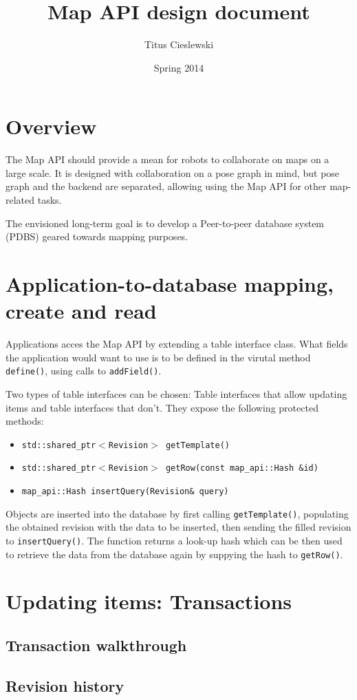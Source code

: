 \documentclass{article}
\title{Map API design document}
\author{Titus Cieslewski}
\date{Spring 2014}
\begin{document}
\maketitle

\section{Overview}

The Map API should provide a mean for robots to collaborate on maps on a large
scale. It is designed with collaboration on a pose graph in mind, but pose
graph and the backend are separated, allowing using the Map API for other
map-related tasks.

The envisioned long-term goal is to develop a Peer-to-peer database system
(PDBS) geared towards mapping purposes.

\section{Application-to-database mapping, create and read}

Applications acces the Map API by extending a table interface class. What
fields the application would want to use is to be defined in the virutal
method {\tt define()}, using calls to {\tt addField()}.

Two types of table interfaces can be chosen: Table interfaces that allow
updating items and table interfaces that don't. They expose the following
protected methods:

\begin{itemize} \itemsep0em
  \item {\tt std::shared\_ptr$<$Revision$>$ getTemplate()}
  \item {\tt std::shared\_ptr$<$Revision$>$ getRow(const map\_api::Hash \&id)}
  \item {\tt map\_api::Hash insertQuery(Revision\& query)}
\end{itemize}

Objects are inserted into the database by first calling {\tt getTemplate()},
populating the obtained revision with the data to be inserted, then sending
the filled revision to {\tt insertQuery()}. The function returns a look-up
hash which can be then used to retrieve the data from the database again by
suppying the hash to {\tt getRow()}.

\section{Updating items: Transactions}

\subsection{Transaction walkthrough}

\subsection{Revision history}
\end{document}
